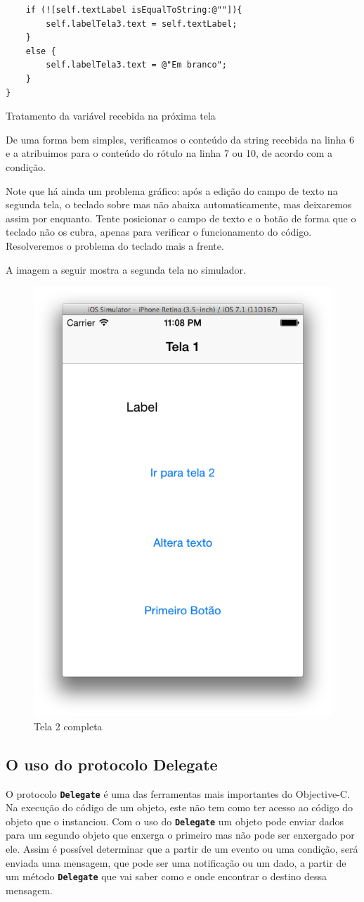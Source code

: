 \documentclass[a4paper,12pt,brazil,doubleside]{book}
\begin{document}
\begin{singlespace}
\begin{listing}[H]
\begin{verbatim}
    if (![self.textLabel isEqualToString:@""]){
        self.labelTela3.text = self.textLabel;
    }
    else {
        self.labelTela3.text = @"Em branco";
    }
}
\end{verbatim}
\caption{Tratamento da variável recebida na próxima tela}
\end{listing}


De uma forma bem simples, verificamos o conteúdo da string recebida na linha 6 e a atribuimos para o conteúdo do rótulo na linha 7 ou 10, de acordo com a condição.

Note que há ainda um problema gráfico: após a edição do campo de texto na segunda tela, o teclado sobre mas não abaixa automaticamente, mas deixaremos assim por enquanto. Tente posicionar o campo de texto e o botão de forma que o teclado não os cubra, apenas para verificar o funcionamento do código. Resolveremos o problema do teclado mais a frente.

A imagem a seguir mostra a segunda tela no simulador.

\begin{figure}[H]
  \centering
  \includegraphics[width=.55\textwidth]{figuras/3/tela_novo_projeto_47.png}
  \caption{Tela 2 completa}
  \label{fig:a}
\end{figure}

\subsection{O uso do protocolo Delegate}

O protocolo \texttt{\textbf{Delegate}} é uma das ferramentas mais importantes do Objective-C. Na execução do código de um objeto, este não tem como ter acesso ao código do objeto que o instanciou. Com o uso do \texttt{\textbf{Delegate}} um objeto pode enviar dados para um segundo objeto que enxerga o primeiro mas não pode ser enxergado por ele. Assim é possível determinar que a partir de um evento ou uma condição, será enviada uma mensagem, que pode ser uma notificação ou um dado, a partir de um método \texttt{\textbf{Delegate}} que vai saber como e onde encontrar o destino dessa mensagem.


\end{singlespace}
\end{document}

